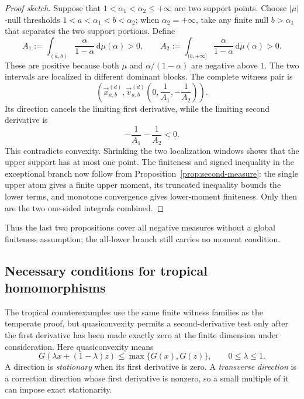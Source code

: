 \documentclass[aps,pra,11pt,onecolumn,nofootinbib,tightenlines]{revtex4-2}
\theoremstyle{definition}
\def\d{\mathrm{d}}
\begin{document}
\begin{proof}[Proof sketch]
Suppose that $1<\alpha_1<\alpha_2\leq+\infty$ are two support points.  Choose
$|\mu|$-null thresholds
$1<a<\alpha_1<b<\alpha_2$; when $\alpha_2=+\infty$, take any finite null
$b>\alpha_1$ that separates the two support portions.  Define
\[
A_1:=\int_{(a,b)}\frac{\alpha}{1-\alpha}\,\d\mu(\alpha)>0,
\qquad
A_2:=\int_{(b,+\infty]}\frac{\alpha}{1-\alpha}\,\d\mu(\alpha)>0.
\]
These are positive because both $\mu$ and $\alpha/(1-\alpha)$ are negative
above $1$.  The two intervals are localized in different dominant blocks.
The complete witness pair is
\begin{equation}
\left(
\vec{x}_{a,b}^{(d)},
\vec{v}_{a,b}^{(d)}\!\left(0,\frac1{A_1},-\frac1{A_2}\right)
\right).
\label{eq:negative-two-upper-witness-pair}
\end{equation}
Its direction cancels the limiting first derivative, while the
limiting second derivative is
\begin{equation}
-\frac1{A_1}-\frac1{A_2}<0.
\end{equation}
This contradicts convexity.  Shrinking the two localization windows shows that
the upper support has at most one point.  The finiteness and signed inequality in
the exceptional branch now follow from Proposition~\ref{prop:second-measure}:
the single upper atom gives a finite upper moment, its truncated inequality
bounds the lower terms, and monotone convergence gives lower-moment finiteness.
Only then are the two one-sided integrals combined.
\end{proof}

Thus the last two propositions cover all negative measures without a global
finiteness assumption; the all-lower branch still carries no moment condition.

\subsection{Necessary conditions for tropical homomorphisms}
\label{sec:necessary-tropical}

The tropical counterexamples use the same finite witness families as the
temperate proof, but quasiconvexity permits a second-derivative test only after
the first derivative has been made exactly zero at the finite dimension under
consideration.
Here quasiconvexity means
\[
G(\lambda x+(1-\lambda)z)
\leq\max\{G(x),G(z)\},
\qquad 0\leq\lambda\leq1.
\]
A direction is \emph{stationary} when its first derivative is zero.  A
\emph{transverse direction} is a correction direction whose first derivative
is nonzero, so a small multiple of it can impose exact stationarity.
\end{document}
